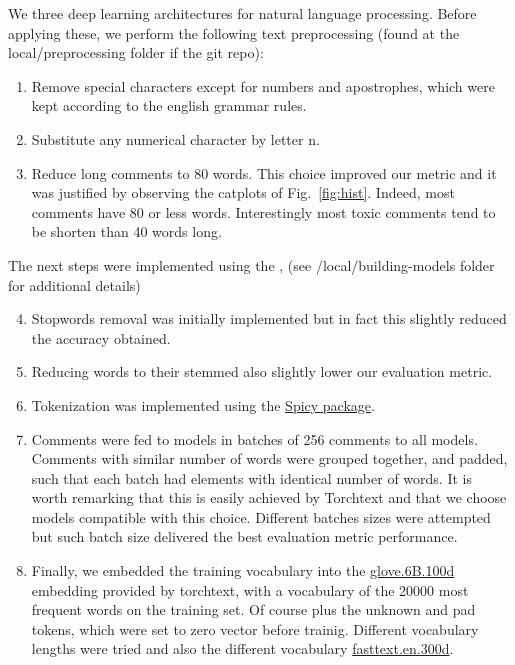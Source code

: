 \documentclass{report}
\begin{document}
We three deep learning architectures for natural
language processing. Before applying these, we perform the following 
text preprocessing (found at the local/preprocessing folder if the git repo):
\begin{enumerate}
\item Remove special characters except for numbers and apostrophes, which
were kept according to the english grammar rules.
\item Substitute any numerical character by letter n.
\item Reduce long comments to 80 words. This choice improved our metric 
and it was justified by observing the catplots of Fig.~\ref{fig:hist}. Indeed, 
most comments have 80 or less words. Interestingly most toxic comments tend 
to be shorten than 40 words long.
\end{enumerate}
The next steps were implemented using the \cite{Torchtext}, 
(see /local/building-models folder for additional details)
\begin{enumerate}
 \setcounter{enumi}{3}
\item Stopwords removal was initially implemented but in fact this slightly reduced the
accuracy obtained. 
\item Reducing words to their stemmed also slightly lower our evaluation metric.
\item Tokenization was implemented using the \href{https://scipy.org/scipylib/}{Spicy package}.
\item Comments were fed to models in batches of 256 comments to all models. Comments
 with similar number of words were grouped together, and padded, such that 
each batch had elements with identical number of words. It is worth remarking that this is
easily achieved by Torchtext and that we choose models compatible with this choice. Different 
batches sizes were attempted but such batch size delivered the best evaluation metric performance. 

\item Finally, we embedded the training vocabulary into the 
\href{https://nlp.stanford.edu/projects/glove/}{glove.6B.100d} embedding 
provided by torchtext, with a vocabulary of the 20000 most frequent words on the
training set. Of course plus the unknown and pad tokens, which were set to zero vector before trainig. 
Different vocabulary lengths were tried and also the different vocabulary \href{https://fasttext.cc/}{fasttext.en.300d}. 

\end{enumerate}
\end{document}
